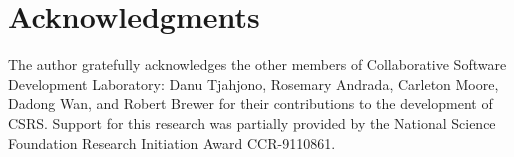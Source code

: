 \section*{Acknowledgments}

The author gratefully acknowledges the other members of Collaborative
Software Development Laboratory: Danu Tjahjono, Rosemary Andrada, Carleton
Moore, Dadong Wan, and Robert Brewer for their contributions to the
development of CSRS. Support for this research was partially provided by
the National Science Foundation Research Initiation Award CCR-9110861.



